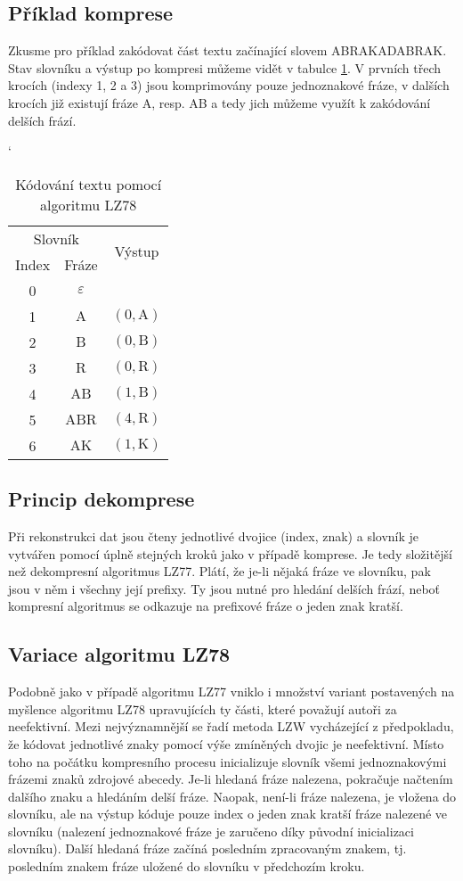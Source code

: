 \subsection{Příklad komprese}
Zkusme pro příklad zakódovat část textu začínající slovem ABRAKADABRAK. Stav slovníku a výstup po kompresi můžeme vidět v tabulce \ref{LZ78tabulka}. V prvních třech krocích (indexy 1, 2 a 3) jsou komprimovány pouze jednoznakové fráze, v dalších krocích již existují fráze A, resp. AB a tedy jich můžeme využít k zakódování delších frází.

\begin{table}[!htb]
\catcode`
\centering
\begin{tabular}{|c|c|c|}
\hline
\multicolumn{2}{|c|}{Slovník} & \multirow{2}{*}{Výstup}\\
\cline{1-2}
Index & Fráze & \\
\hline
0 & $\varepsilon$ & \\
1 & $\mathrm{A}$ & $(0,\mathrm{A})$\\
2 & $\mathrm{B}$ & $(0,\mathrm{B})$\\
3 & $\mathrm{R}$ & $(0,\mathrm{R})$\\
4 & $\mathrm{AB}$ & $(1,\mathrm{B})$\\
5 & $\mathrm{ABR}$ & $(4,\mathrm{R})$\\
6 & $\mathrm{AK}$ & $(1,\mathrm{K})$\\
\hline
\end{tabular}
\caption{Kódování textu pomocí algoritmu LZ78}
\label{LZ78tabulka}
\end{table}

\subsection{Princip dekomprese}
Při rekonstrukci dat jsou čteny jednotlivé dvojice (index, znak) a slovník je vytvářen pomocí úplně stejných kroků jako v případě komprese. Je tedy složitější než dekompresní algoritmus LZ77. Plátí, že je-li nějaká fráze ve slovníku, pak jsou v něm i všechny její prefixy. Ty jsou nutné pro hledání delších frází, neboť kompresní algoritmus se odkazuje na prefixové fráze o jeden znak kratší.

\subsection{Variace algoritmu LZ78}
Podobně jako v případě algoritmu LZ77 vniklo i množství variant postavených na myšlence algoritmu LZ78 upravujících ty části, které považují autoři za neefektivní. Mezi nej\-vý\-zna\-mně\-jší se řadí metoda LZW vycházející z předpokladu, že kódovat jednotlivé znaky pomocí výše zmíněných dvojic je neefektivní. Místo toho na počátku kompresního procesu inicializuje slovník všemi jednoznakovými frázemi znaků zdrojové abecedy. Je-li hledaná fráze nalezena, pokračuje načtením dalšího znaku a hledáním delší fráze. Naopak, není-li fráze nalezena, je vložena do slovníku, ale na výstup kóduje pouze index o jeden znak kratší fráze nalezené ve slovníku (nalezení jednoznakové fráze je zaručeno díky původní inicializaci slovníku). Další hledaná fráze začíná posledním zpracovaným znakem, tj. posledním znakem fráze uložené do slovníku v předchozím kroku.